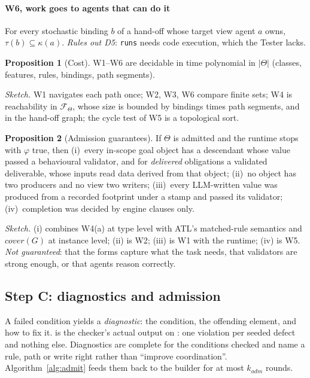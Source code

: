 \documentclass[10pt,conference]{IEEEtran}
\theoremstyle{definition}
\newtheorem{proposition}{Proposition}
\newcommand{\Team}{\Theta}
\newcommand{\W}[1]{\textsf{W#1}}
\newcommand{\D}[1]{\textsf{D#1}}
\newcommand{\code}[1]{\texttt{#1}}
\begin{document}
\paragraph*{\W6, work goes to agents that can do it} For every stochastic
binding $b$ of a hand-off whose target view agent $a$ owns,
$\tau(b)\subseteq\kappa(a)$. \emph{Rules out \D5}: \code{runs} needs code
execution, which the Tester lacks.

\begin{proposition}[Cost]\label{prop:cost}
\W1--\W6 are decidable in time polynomial in $|\Team|$ (classes, features,
rules, bindings, path segments).
\end{proposition}
\noindent\emph{Sketch.} \W1 navigates each path once; \W2, \W3, \W6 compare
finite sets; \W4 is reachability in $\mathcal{F}_\Team$, whose size is bounded
by bindings times path segments, and in the hand-off graph; the cycle test of
\W5 is a topological sort.

\begin{proposition}[Admission guarantees]\label{prop:guarantee}
If $\Team$ is admitted and the runtime stops with $\varphi$ true, then (i)~every
in-scope goal object has a descendant whose value passed a behavioural
validator, and for \emph{delivered} obligations a validated deliverable,
whose inputs read data derived from that object; (ii)~no object has two
producers and no view two writers; (iii)~every LLM-written value was produced
from a recorded footprint under a stamp and passed its validator;
(iv)~completion was decided by engine clauses only.
\end{proposition}
\noindent\emph{Sketch.} (i) combines \W4(a) at type level with ATL's
matched-rule semantics and $\mathit{cover}(G)$ at instance level; (ii) is
\W2; (iii) is \W1 with the runtime; (iv) is \W5. \emph{Not guaranteed}: that
the forms capture what the task needs, that validators are strong enough, or
that agents reason correctly.

\subsection{Step C: diagnostics and admission}\label{sec:admit}

A failed condition yields a \emph{diagnostic}: the condition, the offending
element, and how to fix it.  is the checker's actual output on
: one violation per seeded defect and nothing else.
Diagnostics are complete for the conditions checked and name a rule, path or
write right rather than ``improve coordination''. Algorithm~\ref{alg:admit}
feeds them back to the builder for at most $k_{\mathit{adm}}$ rounds.
\end{document}
